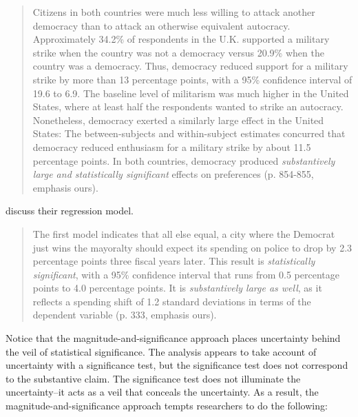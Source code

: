 \documentclass[12pt]{article}
\begin{document}
\begin{quote}
Citizens in both countries were much less willing to attack another democracy than to attack an otherwise equivalent autocracy. Approximately 34.2\% of respondents in the U.K. supported a military strike when the country was not a democracy versus 20.9\% when the country was a democracy. Thus, democracy reduced support for a military strike by more than 13 percentage points, with a 95\% confidence interval of 19.6 to 6.9. The baseline level of militarism was much higher in the United States, where at least half the respondents wanted to strike an autocracy. Nonetheless, democracy exerted a similarly large effect in the United States: The between-subjects and within-subject estimates concurred that democracy reduced enthusiasm for a military strike by about 11.5 percentage points. In both countries, democracy produced \emph{substantively large and statistically significant} effects on preferences (p. 854-855, emphasis ours).
\end{quote}

\cite{GerberHopkins2011} discuss their regression model.

\begin{quote}
The first model indicates that all else equal, a city where the Democrat just wins the mayoralty should expect its spending on police to drop by 2.3 percentage points three fiscal years later. This result is \emph{statistically significant}, with a 95\% confidence interval that runs from 0.5 percentage points to 4.0 percentage points. It is \emph{substantively large as well}, as it reflects a spending shift of 1.2 standard deviations in terms of the dependent variable (p. 333, emphasis ours).
\end{quote}

%

Notice that the magnitude-and-significance approach places uncertainty behind the veil of statistical significance. The analysis appears to take account of uncertainty with a significance test, but the significance test does not correspond to the substantive claim. The significance test does not illuminate the uncertainty--it acts as a veil that conceals the uncertainty. As a result, the magnitude-and-significance approach tempts researchers to do the following:
\end{document}

